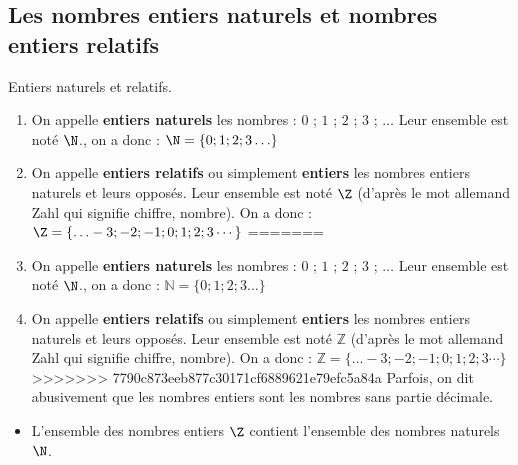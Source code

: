 \begin{pageCours}


\section{Les nombres entiers naturels et nombres entiers relatifs}

\begin{DefT}{Entiers naturels et relatifs.}

\begin{enumerate}
<<<<<<< HEAD
\item On appelle \textbf{entiers naturels} les nombres : $0$ ; $1$ ; $2$ ; $3$ ; $\ldots$  Leur ensemble est noté $\N$., on a donc : $\N =  \lbrace 0 ; 1 ; 2 ; 3 \ldots \rbrace $
 
\item  On appelle \textbf{entiers relatifs} ou simplement \textbf{entiers} les nombres entiers naturels et leurs opposés. Leur ensemble est noté $\Z$ (d'après le mot allemand Zahl qui signifie chiffre, nombre).
On a donc : $\Z = \lbrace \ldots -3 ; -2 ; -1 ; 0 ; 1 ; 2 ; 3  \cdots  \rbrace$
=======
\item On appelle \textbf{entiers naturels} les nombres : $0$ ; $1$ ; $2$ ; $3$ ; $\ldots$  Leur ensemble est noté $\N$., on a donc : $\mathbb N=  \lbrace 0 ; 1 ; 2 ; 3 \ldots \rbrace $
 
\item  On appelle \textbf{entiers relatifs} ou simplement \textbf{entiers} les nombres entiers naturels et leurs opposés. Leur ensemble est noté $\mathbb Z$ (d'après le mot allemand Zahl qui signifie chiffre, nombre).
On a donc : $\mathbb Z = \lbrace \ldots -3 ; -2 ; -1 ; 0 ; 1 ; 2 ; 3  \cdots  \rbrace$
>>>>>>> 7790c873eeb877c30171cf6889621e79efc5a84a
Parfois, on dit abusivement que les nombres entiers sont les nombres sans partie décimale.
\end{enumerate}
\end{DefT}

\begin{minipage}{0.6\linewidth}
\begin{Rqs} 
\begin{itemize}[leftmargin=*]
\item L'ensemble des nombres entiers $\Z$ contient l'ensemble des nombres naturels $\N$. 


\end{itemize}
\end{Rqs}
\end{minipage}
\end{pageCours}
